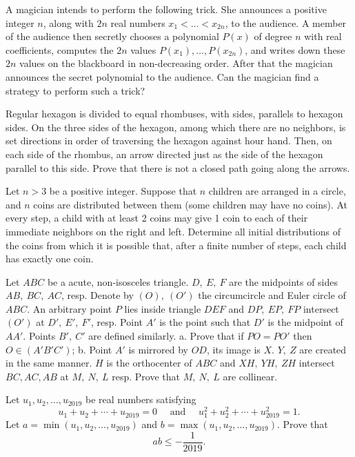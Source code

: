 \documentclass[11pt]{scrartcl}
\begin{document}
\begin{problem}[448881061747528]
A magician intends to perform the following trick. She announces a positive integer $n$, along with $2n$ real numbers $x_1 < \dots < x_{2n}$, to the audience. A member of the audience then secretly chooses a polynomial $P(x)$ of degree $n$ with real coefficients, computes the $2n$ values $P(x_1), \dots , P(x_{2n})$, and writes down these $2n$ values on the blackboard in non-decreasing order. After that the magician announces the secret polynomial to the audience. Can the magician find a strategy to perform such a trick?
\end{problem}
\begin{problem}[6576585943791349484]
Regular hexagon is divided to equal rhombuses, with sides, parallels to hexagon sides. On the three sides of the hexagon, among which there are no neighbors, is set directions in order of traversing the hexagon against hour hand. Then, on each side of the rhombus, an arrow directed just as the side of the hexagon parallel to this side. Prove that there is not a closed path going along the arrows.
\end{problem}
\begin{problem}[931951248564234]
Let $n > 3$ be a positive integer. Suppose that $n$ children are arranged in a circle, and $n$ coins are distributed between them (some children may have no coins). At every step, a child with at least 2 coins may give 1 coin to each of their immediate neighbors on the right and left. Determine all initial distributions of the coins from which it is possible that, after a finite number of steps, each child has exactly one coin.
\end{problem}
\begin{problem}[7220404010846068686]
	Let $ABC$ be a acute, non-isosceles triangle. $D,\ E,\ F$ are the midpoints of sides $AB,\ BC,\ AC$, resp. Denote by $(O),\ (O')$ the circumcircle and Euler circle of $ABC$. An arbitrary point $P$ lies inside triangle $DEF$ and $DP,\ EP,\ FP$ intersect $(O')$ at $D',\ E',\ F'$, resp. Point $A'$ is the point such that $D'$ is the midpoint of $AA'$. Points $B',\ C'$ are defined similarly.
a. Prove that if $PO=PO'$ then $O\in(A'B'C')$;
b. Point $A'$ is mirrored by $OD$, its image is $X$. $Y,\ Z$ are created in the same manner. $H$ is the orthocenter of $ABC$ and $XH,\ YH,\ ZH$ intersect $BC, AC, AB$ at $M,\ N,\ L$ resp. Prove that $M,\ N,\ L$ are collinear.
\end{problem}
\begin{problem}[3192129869376364982]
Let $u_1, u_2, \dots, u_{2019}$ be real numbers satisfying\[u_{1}+u_{2}+\cdots+u_{2019}=0 \quad \text { and } \quad u_{1}^{2}+u_{2}^{2}+\cdots+u_{2019}^{2}=1.\]Let $a=\min \left(u_{1}, u_{2}, \ldots, u_{2019}\right)$ and $b=\max \left(u_{1}, u_{2}, \ldots, u_{2019}\right)$. Prove that
\[
a b \leqslant-\frac{1}{2019}.
\]
\end{problem}
\end{document}
